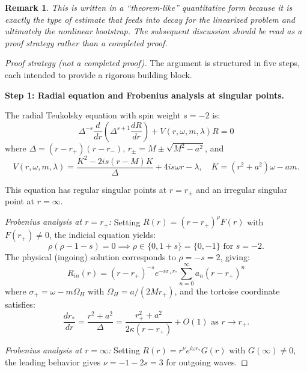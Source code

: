 \documentclass[12pt,a4paper]{article}
\newtheorem{remark}[theorem]{Remark}
\begin{document}
\begin{remark}
This is written in a ``theorem-like'' quantitative form because it is exactly the type of estimate that feeds into decay for the linearized problem and ultimately the nonlinear bootstrap. The subsequent discussion should be read as a proof \emph{strategy} rather than a completed proof.
\end{remark}

\begin{proof}[Proof strategy (not a completed proof)]
The argument is structured in five steps, each intended to provide a rigorous building block.

\textbf{Step 1: Radial equation and Frobenius analysis at singular points.}

The radial Teukolsky equation with spin weight $s = -2$ is:
\begin{equation}\label{eq:teukolsky-radial}
\Delta^{-s}\frac{d}{dr}\left(\Delta^{s+1}\frac{dR}{dr}\right) + V(r, \omega, m, \lambda)R = 0
\end{equation}
where $\Delta = (r-r_+)(r-r_-)$, $r_\pm = M \pm \sqrt{M^2 - a^2}$, and
\begin{equation}
V(r,\omega,m,\lambda) = \frac{K^2 - 2is(r-M)K}{\Delta} + 4is\omega r - \lambda, \quad K = (r^2 + a^2)\omega - am.
\end{equation}

This equation has regular singular points at $r = r_\pm$ and an irregular singular point at $r = \infty$.

\textit{Frobenius analysis at $r = r_+$:} Setting $R(r) = (r-r_+)^\rho F(r)$ with $F(r_+) \neq 0$, the indicial equation yields:
\begin{equation}
\rho(\rho - 1 - s) = 0 \implies \rho \in \{0, 1+s\} = \{0, -1\} \text{ for } s = -2.
\end{equation}
The physical (ingoing) solution corresponds to $\rho = -s = 2$, giving:
\begin{equation}
R_{in}(r) = (r-r_+)^{-s} e^{-i\sigma_+ r_*}\sum_{n=0}^\infty a_n (r-r_+)^n
\end{equation}
where $\sigma_+ = \omega - m\Omega_H$ with $\Omega_H = a/(2Mr_+)$, and the tortoise coordinate satisfies:
\begin{equation}
\frac{dr_*}{dr} = \frac{r^2 + a^2}{\Delta} = \frac{r_+^2 + a^2}{2\kappa(r-r_+)} + O(1) \text{ as } r \to r_+.
\end{equation}

\textit{Frobenius analysis at $r = \infty$:} Setting $R(r) = r^\nu e^{i\omega r_*} G(r)$ with $G(\infty) \neq 0$, the leading behavior gives $\nu = -1 - 2s = 3$ for outgoing waves.


\end{proof}
\end{document}
